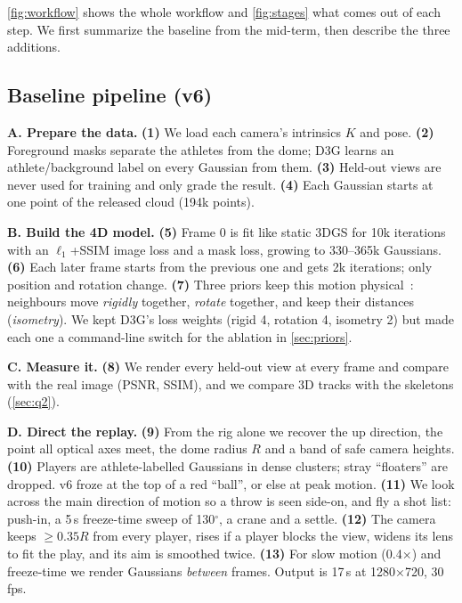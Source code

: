 \documentclass[10pt,twocolumn,letterpaper]{article}
\newcommand{\step}[1]{\textbf{(#1)}}
\begin{document}
\cref{fig:workflow} shows the whole workflow and \cref{fig:stages} what comes out of each step. We first summarize the baseline from the mid-term, then describe the three additions.

\subsection{Baseline pipeline (v6)}
\noindent\textbf{A. Prepare the data.} \step{1} We load each camera's intrinsics $K$ and pose. \step{2} Foreground masks separate the athletes from the dome; D3G learns an athlete/background label on every Gaussian from them. \step{3} Held-out views are never used for training and only grade the result. \step{4} Each Gaussian starts at one point of the released cloud (194k points).

\noindent\textbf{B. Build the 4D model.} \step{5} Frame 0 is fit like static 3DGS for 10k iterations with an $\ell_1$+SSIM image loss and a mask loss, growing to 330--365k Gaussians. \step{6} Each later frame starts from the previous one and gets 2k iterations; only position and rotation change. \step{7} Three priors keep this motion physical~\cite{luiten2024dynamic}: neighbours move \emph{rigidly} together, \emph{rotate} together, and keep their distances (\emph{isometry}). We kept D3G's loss weights (rigid 4, rotation 4, isometry 2) but made each one a command-line switch for the ablation in \cref{sec:priors}.

\noindent\textbf{C. Measure it.} \step{8} We render every held-out view at every frame and compare with the real image (PSNR, SSIM), and we compare 3D tracks with the skeletons (\cref{sec:q2}).

\noindent\textbf{D. Direct the replay.} \step{9} From the rig alone we recover the up direction, the point all optical axes meet, the dome radius $R$ and a band of safe camera heights. \step{10} Players are athlete-labelled Gaussians in dense clusters; stray ``floaters'' are dropped. v6 froze at the top of a red ``ball'', or else at peak motion. \step{11} We look across the main direction of motion so a throw is seen side-on, and fly a shot list: push-in, a 5\,s freeze-time sweep of 130$^\circ$, a crane and a settle. \step{12} The camera keeps $\ge 0.35R$ from every player, rises if a player blocks the view, widens its lens to fit the play, and its aim is smoothed twice. \step{13} For slow motion (0.4$\times$) and freeze-time we render Gaussians \emph{between} frames. Output is 17\,s at 1280$\times$720, 30\,fps.
\end{document}
